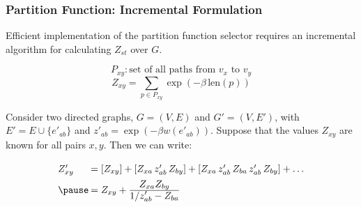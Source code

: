 \begin{frame}
   \frametitle{Partition Function: Incremental Formulation}
   
   Efficient implementation of the partition function selector
   requires an incremental algorithm for calculating $Z_{st}$ over $G$.
   
   \begin{equation*}
      P_{xy}: \mbox{set of all paths from $v_x$ to $v_y$}
   \end{equation*}
   \begin{equation*}
      Z_{xy} = \sum_{p \in P_{xy}} \exp( - \beta \, \mbox{len}(p) )
   \end{equation*}
   
   \pause
   Consider two directed graphs, $G=(V,E)$ and $G'=(V,E')$,
   with $E' = E \cup \{ e'_{ab} \}$
   and $z'_{ab} = \exp(-\beta w(e'_{ab}))$.
   Suppose that the values $Z_{xy}$ are known for all pairs $x,y$.
   Then we can write:
   \pause
   \begin{equation*}
      \arraycolsep=1pt
      \def\arraystretch{1.8}
      \begin{array}{ll}
      Z'_{xy}
         & = \left[ Z_{xy} \right]
         + \left[ Z_{xa} \, z'_{ab} \, Z_{by} \right]
         + \left[ Z_{xa} \, z'_{ab} \, Z_{ba} \, z'_{ab} \, Z_{by} \right]
         + \dots \\
      \pause
      & = Z_{xy} + \frac{\displaystyle Z_{xa} Z_{by}}{\displaystyle 1 / z'_{ab} - Z_{ba}}
      \end{array}
   \end{equation*}
   
\end{frame}
